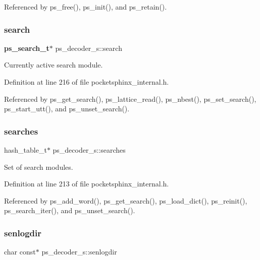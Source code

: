 Referenced by ps\+\_\+free(), ps\+\_\+init(), and ps\+\_\+retain().

\mbox{\label{structps__decoder__s_ad337270efc93613cf8dd7594f6515799}} 
\subsubsection{search}
{\footnotesize\ttfamily \textbf{ ps\+\_\+search\+\_\+t}$\ast$ ps\+\_\+decoder\+\_\+s\+::search}



Currently active search module. 



Definition at line 216 of file pocketsphinx\+\_\+internal.\+h.



Referenced by ps\+\_\+get\+\_\+search(), ps\+\_\+lattice\+\_\+read(), ps\+\_\+nbest(), ps\+\_\+set\+\_\+search(), ps\+\_\+start\+\_\+utt(), and ps\+\_\+unset\+\_\+search().

\mbox{\label{structps__decoder__s_a43bca42790684eefb8d01a0aef6fa530}} 
\subsubsection{searches}
{\footnotesize\ttfamily hash\+\_\+table\+\_\+t$\ast$ ps\+\_\+decoder\+\_\+s\+::searches}



Set of search modules. 



Definition at line 213 of file pocketsphinx\+\_\+internal.\+h.



Referenced by ps\+\_\+add\+\_\+word(), ps\+\_\+get\+\_\+search(), ps\+\_\+load\+\_\+dict(), ps\+\_\+reinit(), ps\+\_\+search\+\_\+iter(), and ps\+\_\+unset\+\_\+search().

\mbox{\label{structps__decoder__s_a0ed3476113fe3d63b13ac5e8da3f3b4f}} 
\subsubsection{senlogdir}
{\footnotesize\ttfamily char const$\ast$ ps\+\_\+decoder\+\_\+s\+::senlogdir}



